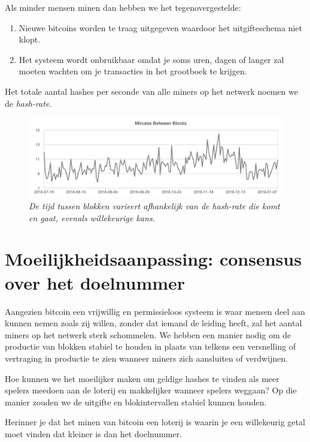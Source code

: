 \documentclass[smalldemyvopaper,11pt,twoside,onecolumn,openright,extrafontsizes]{memoir}
\begin{document}
Als minder mensen minen dan hebben we het tegenovergestelde:

\begin{enumerate}
    \item Nieuwe bitcoins worden te traag uitgegeven waardoor het uitgifteschema niet klopt.
    \item Het systeem wordt onbruikbaar omdat je soms uren, dagen of langer zal moeten wachten om je transacties in het grootboek te krijgen.
\end{enumerate}

Het totale aantal hashes per seconde van alle miners op het netwerk noemen we de \textit{hash-rate}.



\begin{figure}
    \centering
    \includegraphics[width=\textwidth]{images/fig7.png}
    \caption{\footnotesize{\textit{De tijd tussen blokken varieert afhankelijk van de hash-rate die komt en gaat, evenals willekeurige kans.}}}
    \label{fig7}
\end{figure}


\section{Moeilijkheidsaanpassing: consensus over het doelnummer}

Aangezien bitcoin een vrijwillig en permissieloos systeem is waar mensen deel aan kunnen nemen zoals zij willen, zonder dat iemand de leiding heeft, zal het aantal miners op het netwerk sterk schommelen. We hebben een manier nodig om de productie van blokken stabiel te houden in plaats van telkens een versnelling of vertraging in productie te zien wanneer miners zich aansluiten of verdwijnen.

Hoe kunnen we het moeilijker maken om geldige hashes te vinden als meer spelers meedoen aan de loterij en makkelijker wanneer spelers weggaan? Op die manier zouden we de uitgifte en blokintervallen stabiel kunnen houden.

Herinner je dat het minen van bitcoin een loterij is waarin je een willekeurig getal moet vinden dat kleiner is dan het doelnummer.
\end{document}
